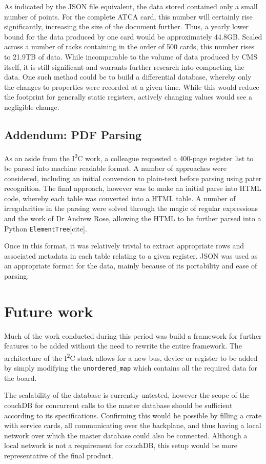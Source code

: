 \documentclass[a4paper,11pt,twocolumn]{article}
\begin{document}
	As indicated by the JSON file equivalent, the data stored contained only a small number of points. For the complete ATCA card, this number will certainly rise significantly, increasing the size of the document further. Thus, a yearly lower bound for the data produced by one card would be approximately 44.8GB. Scaled across a number of racks containing in the order of 500 cards, this number rises to 21.9TB of data. While incomparable to the volume of data produced by CMS itself, it is still significant and warrants further research into compacting the data. One such method could be to build a differential database, whereby only the changes to properties were recorded at a given time. While this would reduce the footprint for generally static registers, actively changing values would see a negligible change. 
	
	\subsection{Addendum: PDF Parsing} 
	As an aside from the I\textsuperscript{2}C work, a colleague requested a 400-page register list to be parsed into machine readable format. A number of approaches were considered, including an initial conversion to plain-text before parsing using pater recognition. The final approach, however was to make an initial parse into HTML code, whereby each table was converted into a HTML table. A number of irregularities in the parsing were solved through the magic of regular expressions and the work of Dr Andrew Rose, allowing the HTML to be further parsed into a Python \verb|ElementTree|[cite].  
	
	Once in this format, it was relatively trivial to extract appropriate rows and associated metadata in each table relating to a given register. JSON was used as an appropriate format for the data, mainly because of its portability and ease of parsing. 
	
	\section{Future work} 
	Much of the work conducted during this period was build a framework for further features to be added without the need to rewrite the entire framework. The architecture of the I\textsuperscript{2}C stack allows for a new bus, device or register to be added by simply modifying the \verb|unordered_map| which contains all the required data for the board. 
	
	The scalability of the database is currently untested, however the scope of the couchDB for concurrent calls to the master database should be sufficient according to its specifications. Confirming this would be possible by filling a crate with service cards, all communicating over the backplane, and thus having a local network over which the master database could also be connected. Although a local network is not a requirement for couchDB, this setup would be more representative of the final product. 
	
\end{document}
